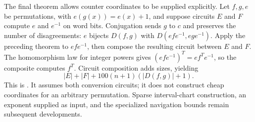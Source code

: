 The final theorem allows counter coordinates to be supplied explicitly.
Let $f,g,e$ be permutations, with $e(g(x))=e(x)+1$, and suppose circuits
$E$ and $F$ compute $e$ and $e^{-1}$ on word bits. Conjugation sends $g$ to
$c$ and preserves the number of disagreements: $e$ bijects $D(f,g)$ with
$D(efe^{-1},ege^{-1})$. Apply the preceding theorem to $efe^{-1}$, then
compose the resulting circuit between $E$ and $F$. The homomorphism law for
integer powers gives $(efe^{-1})^T=ef^Te^{-1}$, so the composite computes
$f^T$. Circuit composition adds sizes, yielding
\[
 |E|+|F|+100(n+1)(|D(f,g)|+1).
\]
This is . It assumes both conversion circuits;
it does not construct cheap coordinates for an arbitrary permutation.
Sparse interval-chart construction, an exponent supplied as input, and the
specialized navigation bounds remain subsequent developments.
